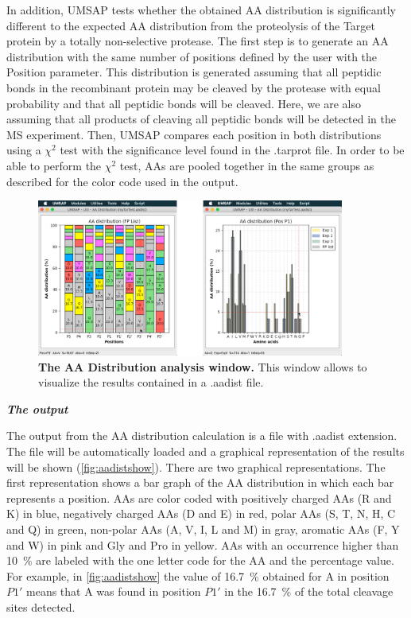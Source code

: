 In addition, UMSAP tests whether the obtained AA distribution is significantly different to the expected AA distribution from the proteolysis of the Target protein by a totally non-selective protease. The first step is to generate an AA distribution with the same number of positions defined by the user with the Position parameter. This distribution is generated assuming that all peptidic bonds in the recombinant protein may be cleaved by the protease with equal probability and that all peptidic bonds will be cleaved. Here, we are also assuming that all products of cleaving all peptidic bonds will be detected in the MS experiment. Then, UMSAP compares each position in both distributions using a $\chi^2$ test with the significance level found in the .tarprot file. In order to be able to perform the $\chi^2$ test, AAs are pooled together in the same groups as described for the color code used in the output.    

\begin{figure}[h]
	\centering
	\includegraphics[width=0.9\textwidth]{./IMAGES/UTIL-AA-WINDOW/util-aa-res.jpg}	    
	\caption[The AA Distribution analysis window]{\textbf{The AA Distribution analysis window.} This window allows to visualize the results contained in a .aadist file.}
	\label{fig:aadistshow}
	\vspace{-5pt} 	
\end{figure}

\textit{\textbf{The output}} 

The output from the AA distribution calculation is a file with .aadist extension. The file will be automatically loaded and a graphical representation of the results will be shown (\autoref{fig:aadistshow}). There are two graphical representations. The first representation shows a bar graph of the AA distribution in which each bar represents a position. AAs are color coded with positively charged AAs (R and K) in blue, negatively charged AAs (D and E) in red, polar AAs (S, T, N, H, C and Q) in green, non-polar AAs (A, V, I, L and M) in gray, aromatic AAs (F, Y and W) in pink and Gly and Pro in yellow. AAs with an occurrence higher than \SI{10}{\percent} are labeled with the one letter code for the AA and the percentage value. For example, in \autoref{fig:aadistshow} the value of \SI{16.7}{\percent} obtained for A in position \(P1'\) means that A was found in position \(P1'\) in the \SI{16.7}{\percent} of the total cleavage sites detected. 

